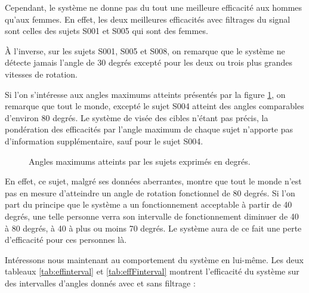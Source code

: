 \documentclass[letterpaper, twoside, 12pt, memoire, creativecommons, hyperref]{thETS}
\begin{document}
Cependant, le système ne donne pas du tout une meilleure efficacité aux hommes qu'aux femmes. En effet, les deux meilleures efficacités avec filtrages du signal sont celles des sujets S001 et S005 qui sont des femmes. 

À l'inverse, sur les sujets S001, S005 et S008, on remarque que le système ne détecte jamais l'angle de 30 degrés excepté pour les deux ou trois plus grandes vitesses de rotation.  

Si l'on s'intéresse aux angles maximums atteints présentés par la figure \ref{fig:anglesmax}, on remarque que tout le monde, excepté le sujet S004 atteint des angles comparables d'environ 80 degrés. Le système de visée des cibles n'étant pas précis, la pondération des efficacités par l'angle maximum de chaque sujet n'apporte pas d'information supplémentaire, sauf pour le sujet S004. 

\begin{figure}
	\centering
	\caption{Angles maximums atteints par les sujets exprimés en degrés.}
	\label{fig:anglesmax}
\end{figure}

En effet, ce sujet, malgré ses données aberrantes, montre que tout le monde n'est pas en mesure d'atteindre un angle de rotation fonctionnel de 80 degrés. Si l'on part du principe que le système a un fonctionnement acceptable à partir de 40 degrés, une telle personne verra son intervalle de fonctionnement diminuer de 40 à 80 degrés, à 40 à plus ou moins 70 degrés. Le système aura de ce fait une perte d'efficacité pour ces personnes là. 

Intéressons nous maintenant au comportement du système en lui-même. Les deux tableaux \ref{tab:effinterval} et \ref{tab:effFinterval} montrent l'efficacité du système sur des intervalles d'angles donnés avec et sans filtrage : 
\end{document}
